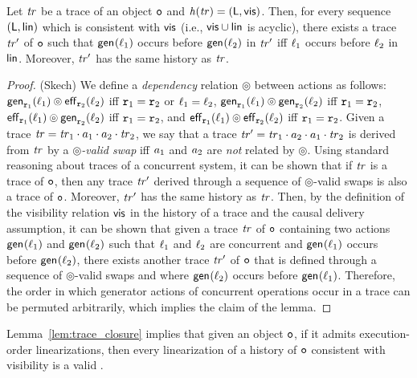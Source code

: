 \begin{lemma}\label{lem:trace_closure}
Let $\mathit{tr}$ be a trace of an object $\mathtt{o}$ and $\mathit{h}({\mathit{tr})}=(\mathsf{L},\mathsf{vis})$. Then, for every sequence $(\mathsf{L},\mathsf{lin})$ which is consistent with $\mathsf{vis}$ (i.e., $\mathsf{vis}
    \cup \mathsf{lin}$ is acyclic), there exists a trace $\mathit{tr}'$ of $\mathtt{o}$ such that $\mathsf{gen}_{}(\ell_1)$ occurs before $\mathsf{gen}_{}(\ell_2)$ in $\mathit{tr}'$ iff $\ell_1$ occurs before $\ell_2$ in $\mathsf{lin}$. Moreover, $\mathit{tr}'$ has the same history as $\mathit{tr}$.
\end{lemma}
\begin{proof}(Skech)
We define a \emph{dependency} relation $\circledcirc$ between actions as follows: $\mathsf{gen}_{\mathtt{r}_1}(\ell_1)\circledcirc \mathsf{eff}_{\mathtt{r}_2}(\ell_2)$ iff $\mathtt{r}_1=\mathtt{r}_2$ or $\ell_1=\ell_2$, $\mathsf{gen}_{\mathtt{r}_1}(\ell_1)\circledcirc \mathsf{gen}_{\mathtt{r}_2}(\ell_2)$ iff $\mathtt{r}_1=\mathtt{r}_2$, $\mathsf{eff}_{\mathtt{r}_1}(\ell_1)\circledcirc \mathsf{gen}_{\mathtt{r}_2}(\ell_2)$ iff $\mathtt{r}_1=\mathtt{r}_2$, and $\mathsf{eff}_{\mathtt{r}_1}(\ell_1)\circledcirc \mathsf{eff}_{\mathtt{r}_2}(\ell_2)$ iff $\mathtt{r}_1=\mathtt{r}_2$. Given a trace $\mathit{tr}=\mathit{tr}_1\cdot a_1\cdot a_2\cdot\mathit{tr}_2$, we say that a trace $\mathit{tr}'=\mathit{tr}_1\cdot a_2\cdot a_1\cdot\mathit{tr}_2$ is derived from $\mathit{tr}$ by a \emph{$\circledcirc$-valid swap} iff $a_1$ and $a_2$ are \emph{not} related by $\circledcirc$. Using standard reasoning about traces of a concurrent system, it can be shown that if $\mathit{tr}$ is a trace of $\mathtt{o}$, then any trace $\mathit{tr}'$ derived through a sequence of $\circledcirc$-valid swaps is also a trace of $\mathtt{o}$. Moreover, $\mathit{tr}'$ has the same history as $\mathit{tr}$. Then, by the definition of the visibility relation $\mathsf{vis}$ in the history of a trace and the causal delivery assumption, it can be shown that given a trace $\mathit{tr}$ of $\mathtt{o}$ containing two actions $\mathsf{gen}_{}(\ell_1)$ and $\mathsf{gen}_{}(\ell_2)$ such that $\ell_1$ and $\ell_2$ are concurrent and $\mathsf{gen}_{}(\ell_1)$ occurs before $\mathsf{gen}_{}(\ell_2)$, there exists another trace $\mathit{tr}'$ of $\mathtt{o}$ that is defined through a sequence of $\circledcirc$-valid swaps and where $\mathsf{gen}_{}(\ell_2)$ occurs before $\mathsf{gen}_{}(\ell_1)$. Therefore, the order in which generator actions of concurrent operations occur in a trace can be permuted arbitrarily, which implies the claim of the lemma.
\end{proof}

Lemma~\ref{lem:trace_closure} implies that given an \crdtlinearizable{} object $\mathtt{o}$, if it admits execution-order linearizations, then every linearization of a history of $\mathtt{o}$ consistent with visibility is a valid \crdtlinearization{}.

